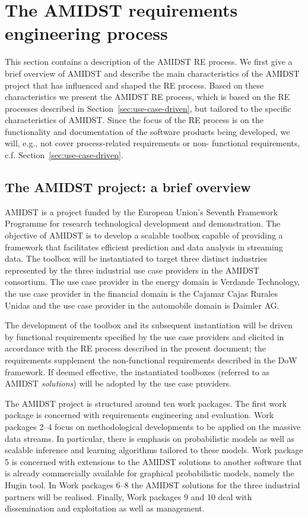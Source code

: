 \section{The AMIDST requirements engineering process}
\label{sec:AmidstRequirementProcess}

This section contains a description of the AMIDST RE process.  We first give a brief overview of AMIDST and describe the 
main characteristics of the AMIDST project that has influenced and shaped the RE process. Based on these characteristics 
we present the AMIDST RE process, which is based on the RE processes described in Section~\ref{sec:use-case-driven}, 
but tailored to the specific characteristics of AMIDST. Since the focus of the RE process is on the functionality and 
documentation of the software products being developed, we will, e.g., not cover process-related requirements or non-
functional requirements, c.f. Section~\ref{sec:use-case-driven}. 

\subsection{The AMIDST project: a brief overview}

AMIDST is a project funded by the European Union's Seventh Framework Programme for research technological development and demonstration. The objective of AMIDST is to develop a scalable toolbox capable of providing a framework that facilitates efficient prediction and data analysis in streaming data. The toolbox will be instantiated to target three distinct industries represented by the three industrial use case providers in the AMIDST consortium. The use case provider in the energy domain is Verdande Technology, the use case provider in the financial domain is the Cajamar Cajas Rurales Unidas and the use case provider in the automobile domain is Daimler AG.  

The development of the toolbox and its subsequent instantiation will be driven by functional requirements specified by the use case providers and elicited in accordance with the RE process described in the present document; the requirements supplement the non-functional requirements described in the DoW framework. If deemed effective, the instantiated toolboxes (referred to as AMIDST \emph{solutions}) will be adopted by the use case providers. 

The AMIDST project is structured around ten work packages. The first work package is concerned with requirements
engineering and evaluation. Work packages 2--4 focus on methodological developments to be applied on the massive data streams.  In particular, there is emphasis on probabilistic models as well as scalable inference and learning
algorithms tailored to these models. Work package 5 is concerned with extensions to the AMIDST solutions to another software that is already commercially available for graphical probabilistic models, namely the Hugin tool.  In Work packages 6--8 the AMIDST solutions for the three industrial partners will be realised. Finally, Work packages 9 and 10 deal with dissemination and exploitation as well as management.     

